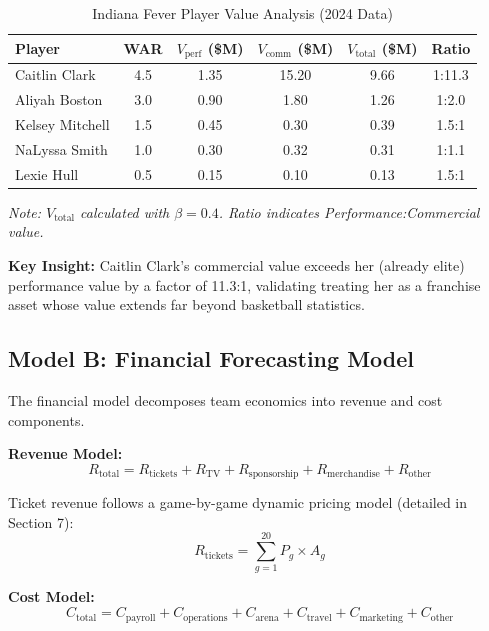 \documentclass{mcmthesis}
\begin{document}
\begin{table}[H]
\centering
\caption{Indiana Fever Player Value Analysis (2024 Data)}
\begin{tabular}{lccccc}
\toprule
\textbf{Player} & \textbf{WAR} & \textbf{$V_{\text{perf}}$ (\$M)} & \textbf{$V_{\text{comm}}$ (\$M)} & \textbf{$V_{\text{total}}$ (\$M)} & \textbf{Ratio} \\
\midrule
Caitlin Clark & 4.5 & 1.35 & 15.20 & 9.66 & 1:11.3 \\
Aliyah Boston & 3.0 & 0.90 & 1.80 & 1.26 & 1:2.0 \\
Kelsey Mitchell & 1.5 & 0.45 & 0.30 & 0.39 & 1.5:1 \\
NaLyssa Smith & 1.0 & 0.30 & 0.32 & 0.31 & 1:1.1 \\
Lexie Hull & 0.5 & 0.15 & 0.10 & 0.13 & 1.5:1 \\
\bottomrule
\end{tabular}
\begin{flushleft}
\small\textit{Note: $V_{\text{total}}$ calculated with $\beta = 0.4$. Ratio indicates Performance:Commercial value.}
\end{flushleft}
\end{table}

\textbf{Key Insight:} Caitlin Clark's commercial value exceeds her (already elite) performance value by a factor of 11.3:1, validating treating her as a franchise asset whose value extends far beyond basketball statistics.

\subsection{Model B: Financial Forecasting Model}

The financial model decomposes team economics into revenue and cost components.

\textbf{Revenue Model:}
\begin{equation}
R_{\text{total}} = R_{\text{tickets}} + R_{\text{TV}} + R_{\text{sponsorship}} + R_{\text{merchandise}} + R_{\text{other}}
\end{equation}

Ticket revenue follows a game-by-game dynamic pricing model (detailed in Section 7):
\begin{equation}
R_{\text{tickets}} = \sum_{g=1}^{20} P_g \times A_g
\end{equation}

\textbf{Cost Model:}
\begin{equation}
C_{\text{total}} = C_{\text{payroll}} + C_{\text{operations}} + C_{\text{arena}} + C_{\text{travel}} + C_{\text{marketing}} + C_{\text{other}}
\end{equation}
\end{document}
